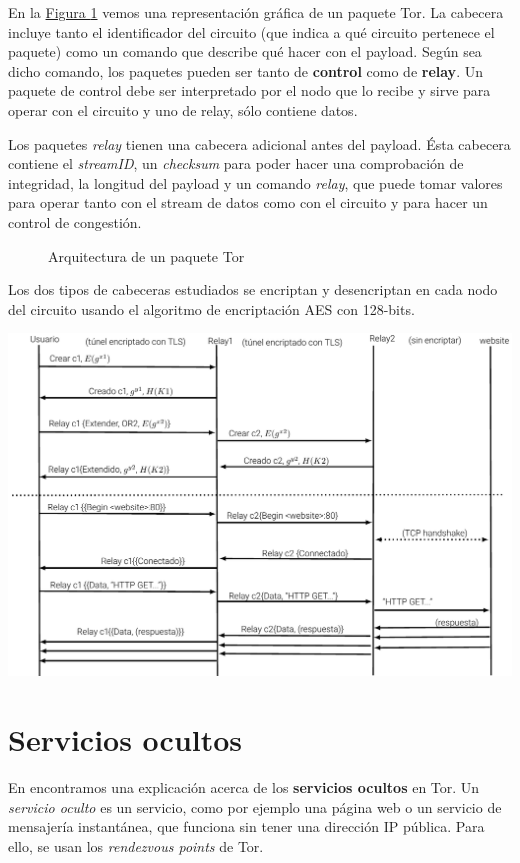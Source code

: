 \documentclass[10pt,a4paper,spanish]{article}
\begin{document}
En la \hyperref[paquete]{Figura \ref*{paquete}} vemos una representación gráfica de un paquete Tor. La cabecera incluye tanto el identificador del circuito (que indica a qué circuito pertenece el paquete) como un comando que describe qué hacer con el payload. Según sea dicho comando, los paquetes pueden ser tanto de \textbf{control} como de \textbf{relay}. Un paquete de control debe ser interpretado por el nodo que lo recibe y sirve para operar con el circuito y uno de relay, sólo contiene datos.

Los paquetes \textit{relay} tienen una cabecera adicional antes del payload. Ésta cabecera contiene el \textit{streamID}, un \textit{checksum} para poder hacer una comprobación de integridad, la longitud del payload y un comando \textit{relay}, que puede tomar valores para operar tanto con el stream de datos como con el circuito y para hacer un control de congestión.

\begin{figure}[!h]
    \centering
    
    \caption{Arquitectura de un paquete Tor}
    \label{paquete}
\end{figure}

Los dos tipos de cabeceras estudiados se encriptan y desencriptan en cada nodo del circuito usando el algoritmo de encriptación AES con 128-bits.

\includegraphics[width=1\textwidth]{comunicaciones}

\section{Servicios ocultos}
En \cite{hiddenservices} encontramos una explicación acerca de los \textbf{servicios ocultos} en Tor. Un \textit{servicio oculto} es un servicio, como por ejemplo una página web o un servicio de mensajería instantánea, que funciona sin tener una dirección IP pública. Para ello, se usan los \textit{rendezvous points} de Tor.
\end{document}
